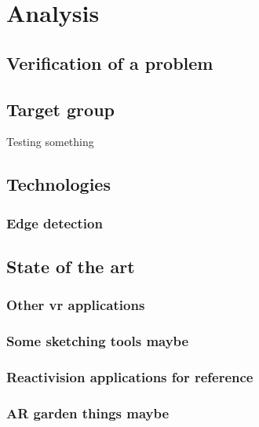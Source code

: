 \chapter{Analysis}
	
	
	\section{Verification of a problem}\label{sec:verification}

	\section{Target group}\label{sec:targetGroup}
		Testing something

	\section{Technologies}\label{sec:technologies}
		\subsection{Edge detection}
		 

    \section{State of the art}\label{sec:SOTA}
		\subsection{Other vr applications}
		\subsection{Some sketching tools maybe}
		\subsection{Reactivision applications for reference}
		\subsection{AR garden things maybe}